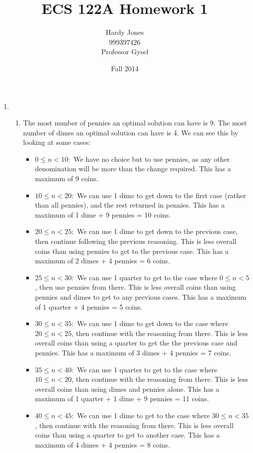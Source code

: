 \documentclass[12pt,letterpaper]{article}
\title{ECS 122A Homework 1\vspace{-2ex}}
\author{Hardy Jones\\
        999397426\\
        Professor Gysel\vspace{-2ex}}
\date{Fall 2014}
\begin{document}
  \maketitle

  \begin{enumerate}
    \item
      \begin{enumerate}
        \item
          The most number of pennies an optimal solution can have is 9.
          The most number of dimes an optimal solution can have is 4.
          We can see this by looking at some cases:
          \begin{itemize}
            \item $0 \le n < 10 :$ We have no choice but to use pennies, as any other denomination will be more than the change required. This has a maximum of 9 coins.
            \item $10 \le n < 20 :$ We can use 1 dime to get down to the first case (rather than all pennies), and the rest returned in pennies. This has a maximum of 1 dime + 9 pennies = 10 coins.
            \item $20 \le n < 25 :$ We can use 1 dime to get down to the previous case, then continue following the previous reasoning. This is less overall coins than using pennies to get to the previous case. This has a maximum of 2 dimes + 4 pennies = 6 coins.
            \item $25 \le n < 30 :$ We can use 1 quarter to get to the case where $0 \le n < 5$, then use pennies from there. This is less overall coins than using pennies and dimes to get to any previous cases. This has a maximum of 1 quarter + 4 pennies = 5 coins.
            \item $30 \le n < 35 :$ We can use 1 dime to get down to the case where $20 \le n < 25$, then continue with the reasoning from there.
            This is less overall coins than using a quarter to get the the previous case and pennies. This has a maximum of 3 dimes + 4 pennies = 7 coins.
            \item $35 \le n < 40 :$ We can use 1 quarter to get to the case where $10 \le n < 20$, then continue with the reasoning from there. This is less overall coins than using dimes and pennies alone. This has a maximum of 1 quarter + 1 dime + 9 pennies = 11 coins.
            \item $40 \le n < 45 :$ We can use 1 dime to get to the case where $30 \le n < 35$, then continue with the reasoning from there. This is less overall coins than using a quarter to get to another case. This has a maximum of 4 dimes + 4 pennies = 8 coins.

\end{itemize}
\end{enumerate}
\end{enumerate}
\end{document}
